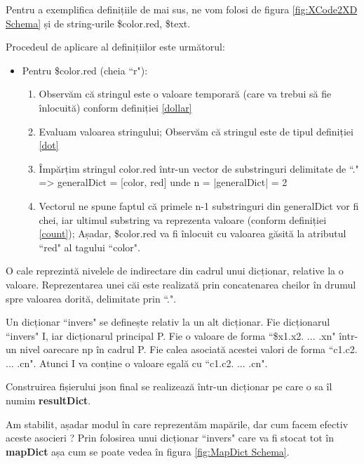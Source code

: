 Pentru a exemplifica definițiile de mai sus, ne vom folosi de figura \ref{fig:XCode2XD Schema} și de string-urile \$color.red, \$text. 

Procedeul de aplicare al definițiilor este următorul:


\begin{itemize} \label{modalitate}
\item Pentru \$color.red (cheia ``r"): 
\begin{enumerate}
\item Observăm că stringul este o valoare temporară (care va trebui să fie înlocuită) conform definiției \ref{dollar}
\item Evaluam valoarea stringului; Observăm că stringul este de tipul definiției \ref{dot}
\item Împărțim stringul color.red într-un vector de substringuri delimitate de ``." => generalDict = [color, red] unde n = |generalDict| = 2
\item Vectorul ne spune faptul că primele n-1 substringuri din generalDict vor fi chei, iar ultimul substring va reprezenta valoare (conform definiției \ref{count}); Așadar, \$color.red va fi înlocuit cu valoarea găsită la atributul ``red" al tagului ``color".
\end{enumerate}
\end{itemize}


\begin{mydef}\label{cale}
O cale reprezintă nivelele de indirectare din cadrul unui dicționar, relative la o valoare.
Reprezentarea unei căi este realizată prin concatenarea cheilor în drumul spre valoarea dorită, delimitate prin ``.".
\end{mydef}


\begin{mydef}

Un dicționar ``invers" se definește relativ la un alt dicționar. 
Fie dicționarul ``invers" I, iar dicționarul principal P. 
Fie o valoare de forma ``\$x1.x2. ... .xn" într-un nivel oarecare np în cadrul P. 
Fie calea asociată acestei valori de forma ``c1.c2. ... .cn".
Atunci I va conține o valoare egală cu ``c1.c2. ... .cn".
\end{mydef}

\begin{myNote}
Construirea fișierului json final se realizează într-un dicționar pe care o sa îl numim \textbf{resultDict}.
\end{myNote}

Am stabilit, așadar modul în care reprezentăm mapările, dar cum facem efectiv aceste asocieri ? Prin folosirea unui dicționar ``invers" care va fi stocat tot în \textbf{mapDict} așa cum se poate vedea în figura \ref{fig:MapDict Schema}.


